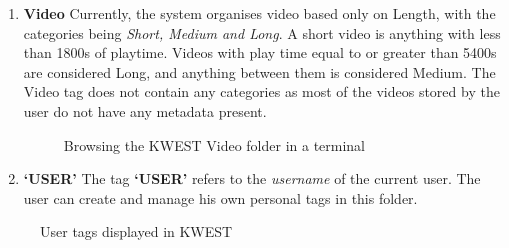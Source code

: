 \begin{enumerate}
\item \textbf{Video} \newline
Currently, the system organises video based only on Length, with the categories being \textit{Short, Medium and Long}. A short video is anything with less than 1800s of playtime. Videos with play time equal to or greater than 5400s are considered Long, and anything between them is considered Medium. The Video tag does not contain any categories as most of the videos stored by the user do not have any metadata present.
\begin{figure}[htb]
\centering
\setlength\fboxsep{0pt}
\setlength\fboxrule{0.5pt}
\caption{Browsing the KWEST Video folder in a terminal}
\label{fig:dfd0}
\end{figure}

\item \textbf{`USER'} \newline
The tag \textbf{`USER'} refers to the \textit{username} of the current user. The user can create and manage his own personal tags in this folder.
\end{enumerate}
\begin{figure}[htb]
\centering
\setlength\fboxsep{0pt}
\setlength\fboxrule{0.5pt}
\caption{User tags displayed in KWEST}
\label{fig:dfd0}
\end{figure}

